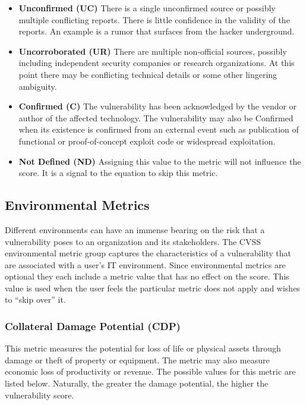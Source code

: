   \begin{itemize}
  \item
    \textbf{Unconfirmed (UC)} There is a single unconfirmed source or
    possibly multiple conflicting reports. There is little confidence in
    the validity of the reports. An example is a rumor that surfaces from
    the hacker underground.
  \item
    \textbf{Uncorroborated (UR)} There are multiple non-official sources,
    possibly including independent security companies or research
    organizations. At this point there may be conflicting technical
    details or some other lingering ambiguity.
  \item
    \textbf{Confirmed (C)} The vulnerability has been acknowledged by the
    vendor or author of the affected technology. The vulnerability may
    also be Confirmed when its existence is confirmed from an external
    event such as publication of functional or proof-of-concept exploit
    code or widespread exploitation.
  \item
    \textbf{Not Defined (ND)} Assigning this value to the metric will not
    influence the score. It is a signal to the equation to skip this
    metric.
  \end{itemize}

  \subsection{Environmental Metrics}\label{environmental-metrics}

  Different environments can have an immense bearing on the risk that a
  vulnerability poses to an organization and its stakeholders. The CVSS
  environmental metric group captures the characteristics of a
  vulnerability that are associated with a user's IT environment. Since
  environmental metrics are optional they each include a metric value that
  has no effect on the score. This value is used when the user feels the
  particular metric does not apply and wishes to ``skip over'' it.

  \subsubsection{Collateral Damage Potential
  (CDP)}\label{collateral-damage-potential-cdp}

  This metric measures the potential for loss of life or physical assets
  through damage or theft of property or equipment. The metric may also
  measure economic loss of productivity or revenue. The possible values
  for this metric are listed below. Naturally, the greater the
  damage potential, the higher the vulnerability score.

